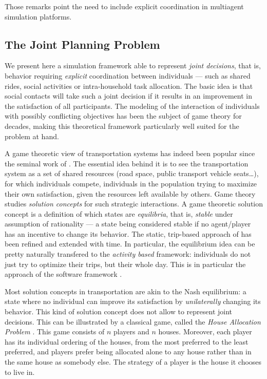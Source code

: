 {Those remarks point the need
to include explicit coordination in multiagent simulation platforms.

\subsection{The Joint Planning Problem}


We present here a simulation framework able to represent \emph{joint decisions},
that is, behavior requiring \emph{explicit} coordination between individuals
--- such as shared rides, social activities or intra-household task allocation.
The basic idea is that social contacts will take such a joint decision if it results
in an improvement in the satisfaction of all participants.
The modeling of the interaction of individuals with possibly conflicting objectives
has been the subject of game theory for decades, making this theoretical framework
particularly well suited for the problem at hand.

A game theoretic view of transportation systems has indeed been popular
since the seminal work of
\citeauthor{Wardrop_PICE_1952}
\cite{Wardrop_PICE_1952}.
The essential idea behind it is to see the transportation system as
a set of shared resources (road space, public transport vehicle seats\ldots),
for which individuals compete, individuals in the population trying to maximize
their own satisfaction, given the resources left available by others.
Game theory studies \emph{solution concepts} for such strategic interactions.
A game theoretic solution concept is a definition of which states are
\emph{equilibria}, that is,
\emph{stable} under assumption of rationality
--- a state being considered stable if no agent/player has an incentive
to change its behavior.
%
The static, trip-based approach of
\citeauthor{Wardrop_PICE_1952}
has been refined and extended with time.
In particular, the equilibrium idea can be pretty naturally transfered to
the \emph{activity based} framework:
individuals do not just try to optimize their trips, 
but their whole day.
%
This is in particular the approach of the \matsim software framework
\cite{Axhausen_SSRL_2006,NagelFloetteroed_IATBR_2009}.

Most solution concepts in transportation are akin to the Nash equilibrium:
a state where no individual can improve its satisfaction
by \emph{unilaterally} changing its behavior.
%
This kind of solution concept does not allow to represent joint decisions.
This can be illustrated by a classical game, called the \emph{House Allocation Problem}
\cite{SchummerVohra_NisanEtAl_2007}.
This game consists of $n$ players and $n$ houses. Moreover, each player has its individual
ordering of the houses, from the most preferred to the least preferred,
and players prefer being allocated alone to any house rather than in the
same house as somebody else.
The strategy of a player is the house it chooses to live in.

}
